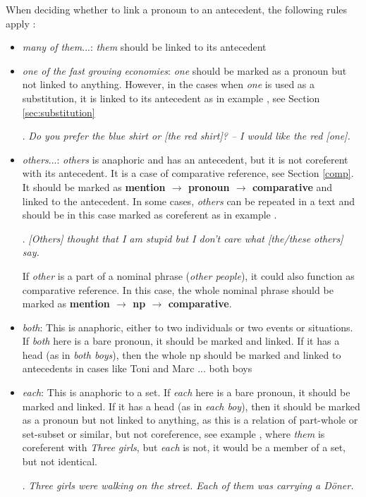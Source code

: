 \documentclass[a4paper]{article}
\begin{document}
When deciding whether to link a pronoun to an antecedent, the following rules apply \cite[p. 9]{GuillouEtAlGuide}:
\begin{itemize}
\item  {\sl many of them}...: {\sl them} should be linked to its antecedent
\item {\sl one of the fast growing economies}: {\sl one} should be marked as a
pronoun but not linked to anything. However, in the cases when \textsl{one} is used as a substitution, it is linked to its antecedent as in example \Next, see Section \ref{sec:substitution}

\ex.
{\sl Do you prefer the blue shirt or [the red shirt]? -- I would like the red [one].}

\item {\sl others}...: {\sl others} is anaphoric and has an antecedent, but it is not coreferent with its antecedent. It is a case of comparative reference, see Section \ref{comp}. It should be marked as {\bf mention $\rightarrow$ pronoun $\rightarrow$ comparative} and linked to the antecedent. %
In some cases, {\sl others} can be repeated in a text and should be in this case marked as coreferent as in example \Next.

\ex. {\sl [Others] thought that I am stupid but I don't care what [the/these others] say.}

If {\sl other} is a part of a nominal phrase ({\sl other people}), it could also function as comparative reference. In this case, the whole nominal phrase should be marked as {\bf mention $\rightarrow$ np $\rightarrow$ comparative}.

\item {\sl both}: This is anaphoric, either to two individuals or two events or situations. If {\sl both} here is a bare pronoun, it should be marked and linked. If
it has a head (as in {\sl both boys}), then the whole np should be marked and linked to antecedents in cases like {Toni and Marc ... both boys}%

\item {\sl each}: This is anaphoric to a set. If {\sl each} here is a bare pronoun, it should be marked and linked. If it has a head (as in {\sl each boy}), then it should be marked as a pronoun but not linked to anything, as this is a relation of part-whole or set-subset or similar, but not coreference, see example \Next, where {\sl them} is coreferent with {\sl Three girls}, but {\sl each} is not, it would be a member of a set, but not identical.

\ex.
{\sl Three girls were walking on the street. Each of them was carrying a D\"oner.}

\end{itemize}
\end{document}
